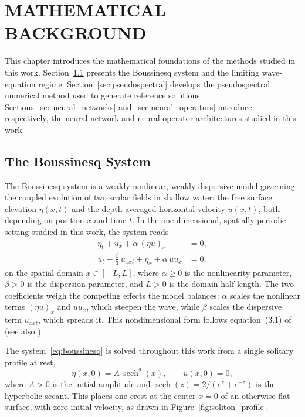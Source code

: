 
\chapter{MATHEMATICAL BACKGROUND}
\label{chap:math-bg}
This chapter introduces the mathematical foundations of the methods studied in this work. Section~\ref{sec:boussinesq} presents the Boussinesq system and the limiting wave-equation regime. Section~\ref{sec:pseudospectral} develops the pseudospectral numerical method used to generate reference solutions. Sections~\ref{sec:neural_networks} and~\ref{sec:neural_operators} introduce, respectively, the neural network and neural operator architectures studied in this work.

\section{The Boussinesq System}
\label{sec:boussinesq}

The Boussinesq system is a weakly nonlinear, weakly dispersive model governing the coupled evolution of two scalar fields in shallow water: the free surface elevation $\eta(x,t)$ and the depth-averaged horizontal velocity $u(x,t)$, both depending on position $x$ and time $t$. In the one-dimensional, spatially periodic setting studied in this work, the system reads
\begin{subequations}\label{eq:boussinesq}
    \begin{align}
        \eta_t + u_x + \alpha\,(\eta u)_x &= 0, \label{eq:bous1} \\[4pt]
        u_t - \frac{\beta}{3}\,u_{xxt} + \eta_x + \alpha\,u u_x &= 0, \label{eq:bous2}
    \end{align}
\end{subequations}
on the spatial domain $x \in [-L, L]$, where $\alpha \geq 0$ is the nonlinearity parameter, $\beta > 0$ is the dispersion parameter, and $L > 0$ is the domain half-length. The two coefficients weigh the competing effects the model balances: $\alpha$ scales the nonlinear terms $(\eta u)_x$ and $u u_x$, which steepen the wave, while $\beta$ scales the dispersive term $u_{xxt}$, which spreads it. This nondimensional form follows equation~(3.1) of \textcite{martins2023} (see also \textcite{martins2024}).

The system~\eqref{eq:boussinesq} is solved throughout this work from a single solitary profile at rest,
\begin{equation}\label{eq:initial_condition}
    \eta(x,0) = A\,\operatorname{sech}^2(x), \qquad u(x,0) = 0,
\end{equation}
where $A > 0$ is the initial amplitude and $\operatorname{sech}(z) = 2/(e^z + e^{-z})$ is the hyperbolic secant. This places one crest at the center $x = 0$ of an otherwise flat surface, with zero initial velocity, as drawn in Figure~\ref{fig:soliton_profile}.

